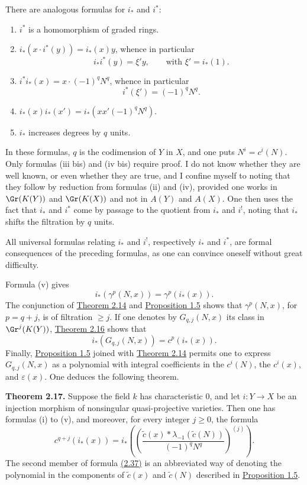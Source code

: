 There are analogous formulas for $i_*$ and $i^*$:
\begin{enumerate}[label=(\roman* bis)]
\item $i^*$ is a homomorphism of graded rings.
\item $i_*(x\cdot i^*(y))=i_*(x)y$, whence in particular
\[
 i_*i^*(y)=\xi' y,
\qquad \text{with }\xi'=i_*(1).
\]
\item $i^*i_*(x)=x\cdot (-1)^qN^q$, whence in particular
\[
 i^*(\xi')=(-1)^qN^q.
\]
\item $i_*(x)i_*(x')=i_*(xx'(-1)^qN^q)$.
\item $i_*$ increases degrees by $q$ units.
\end{enumerate}
In these formulas, $q$ is the codimension of $Y$ in $X$, and one puts $N^i=c^i(N)$. Only formulas (iii bis) and (iv bis) require proof. I do not know whether they are well known, or even whether they are true, and I confine myself to noting that they follow by reduction from formulas (ii) and (iv), provided one works in $\Gr(K(Y))$ and $\Gr(K(X))$ and not in $A(Y)$ and $A(X)$. One then uses the fact that $i_*$ and $i^*$ come by passage to the quotient from $i_*$ and $i^!$, noting that $i_*$ shifts the filtration by $q$ units.

All universal formulas relating $i_*$ and $i^!$, respectively $i_*$ and $i^*$, are formal consequences of the preceding formulas, as one can convince oneself without great difficulty.

Formula (v) gives
\[
 i_*(\gamma^p(N,x))=\gamma^p(i_*(x)).
\]
The conjunction of \hyperlink{sga6.e00.thm.2-14}{Theorem 2.14} and \hyperlink{sga6.e00.prop.1-5}{Proposition 1.5} shows that $\gamma^p(N,x)$, for $p=q+j$, is of filtration $\geq j$. If one denotes by $G_{q,j}(N,x)$ its class in $\Gr^j(K(Y))$, \hyperlink{sga6.e00.thm.2-16}{Theorem 2.16} shows that
\[
 i_*(G_{q,j}(N,x))=c^p(i_*(x)).
\]
Finally, \hyperlink{sga6.e00.prop.1-5}{Proposition 1.5} joined with \hyperlink{sga6.e00.thm.2-14}{Theorem 2.14} permits one to express $G_{q,j}(N,x)$ as a polynomial with integral coefficients in the $c^i(N)$, the $c^i(x)$, and $\varepsilon(x)$. One deduces the following theorem.

\textbf{Theorem 2.17.} Suppose the field $k$ has characteristic $0$, and let $i:Y\to X$ be an injection morphism of nonsingular quasi-projective varieties. Then one has formulas (i) to (v), and moreover, for every integer $j\geq 0$, the formula
\begin{equation}\tag{2.37}
 c^{q+j}(i_*(x))=
 i_*\left(\left(\frac{\widetilde c(x)*\lambda_{-1}(\widetilde c(N))}{(-1)^qN^q}\right)^{(j)}\right).
\end{equation}
The second member of formula \hyperlink{sga6.e00.eq.2-37}{(2.37)} is an abbreviated way of denoting the polynomial in the components of $\widetilde c(x)$ and $\widetilde c(N)$ described in \hyperlink{sga6.e00.prop.1-5}{Proposition 1.5}.

